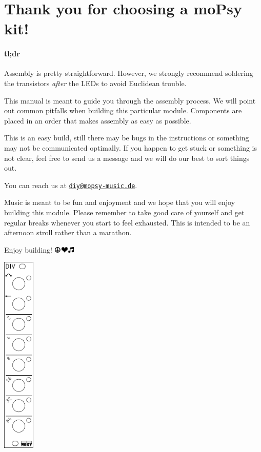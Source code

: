 \documentclass[a4paper,
               11pt,
               parskip=half,
               headinclude,
               titlepage=false]{scrartcl}
\begin{document}
\begin{minipage}{12.5cm}
\setlength{\parskip}{\medskipamount}
\section*{Thank you for choosing a moPsy kit!}

\paragraph{tl;dr} Assembly is pretty straightforward. However, we strongly recommend soldering the transistors \emph{after} the LEDs to avoid Euclidean trouble.

This manual is meant to guide you through the assembly process.
We will point out common pitfalls when building this particular module.
Components are placed in an order that makes assembly as easy as possible.

This is an {\color{level_easy}easy} build, still there may be bugs in the instructions or something may not be communicated optimally.
If you happen to get stuck or something is not clear, feel free to send us a message and we will do our best to sort things out.

You can reach us at \href{mailto:diy@mopsy-music.de}{\texttt{diy@mopsy-music.de}}.

Music is meant to be fun and enjoyment and we hope that you will enjoy building this module.
Please remember to take good care of yourself and get regular breaks whenever you start to feel exhausted. This is intended to be an afternoon stroll rather than a marathon.

\vspace{1em}
Enjoy building! \quad \includegraphics[height=0.8em]{peace_love_music}

\end{minipage}
\hspace{0.5cm}
\begin{minipage}{1.5cm}
\includegraphics[width=1.5cm]{div-frontpanel}
\end{minipage}
\end{document}
